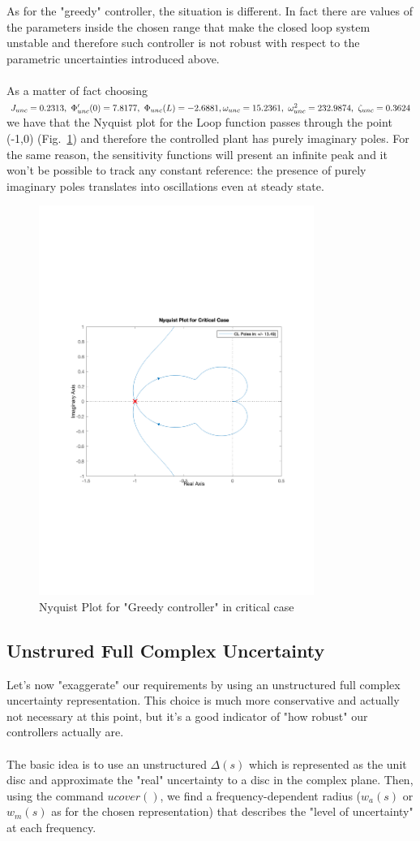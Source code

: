 \documentclass[a4paper, 12pt]{article}
\def\FigureSeven{\centering\includegraphics[width=0.8\textwidth]{Figures/fig07.pdf}}
\begin{document}
\\\\ 
As for the "greedy" controller, the situation is different. In fact there are values of the parameters inside the chosen range that make the closed loop system unstable and therefore such controller is not robust with respect to the parametric uncertainties introduced above. 
\\\\ As a matter of fact choosing $J_{unc} = 0.2313,\ \Phi_{unc}'(0) = 7.8177,\ \Phi_{unc}(L)= -2.6881,\\ \omega_{unc} = 15.2361,\ \omega_{unc}^2=232.9874,\ \zeta_{unc} = 0.3624$ we have that the Nyquist plot for the Loop function passes through the point (-1,0) (Fig.~\ref{fig:fig07}) and therefore the controlled plant has purely imaginary poles. For the same reason, the sensitivity functions will present an infinite peak and it won't be possible to track any constant reference: the presence of purely imaginary poles translates into oscillations even at steady state.

\begin{figure}[h!]
    \FigureSeven
    \caption{Nyquist Plot for "Greedy controller" in critical case}
    \label{fig:fig07}
\end{figure}

\subsection{Unstrured Full Complex Uncertainty}
Let's now "exaggerate" our requirements by using an unstructured full complex uncertainty representation. This choice is much more conservative and actually not necessary at this point, but it's a good indicator of "how robust" our controllers actually are.
\\\\
The basic idea is to use an unstructured $\Delta(s)$ which is represented as the unit disc and approximate the "real" uncertainty to a disc in the complex plane. Then, using the command $ucover()$, we find a frequency-dependent radius ($w_a(s)$ or $w_m(s)$ as for the chosen representation) that describes the "level of uncertainty" at each frequency.
\end{document}
